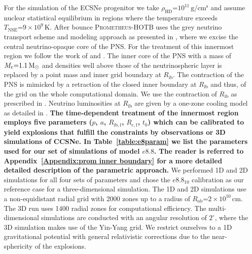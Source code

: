 \documentclass[fleqn,usenatbib]{mnras}
\newcommand{\solm}{\ensuremath{\rm{M_{\odot}}}\xspace}
\newcommand{\prom}{\textsc{Prometheus-HOTB}\xspace}
\begin{document}
For the simulation of the ECSNe progenitor we take $\rho_{\mathrm{HD}}\mathord{=}10^{11}\,\mathrm{g/cm^s}$ and assume nuclear statistical equilibrium in regions where the temperature exceeds $T_{\mathrm{NSE}}\mathord{=}9\times10^9\,\mathrm{K}$.
After bounce \prom uses the grey neutrino transport scheme and modeling approach as presented in \cite{Scheck2006}, where we excise the central neutrino-opaque core of the PNS. For the treatment of this innermost region we follow the work of \cite{Ugliano2012} and \cite{Sukhbold2016}. 
The inner core of the PNS with a mass of $M_{\mathrm{c}}\mathord{=}1.1\,\solm$ and densities well above those of the neutrinospheric layer is replaced by a point mass and inner grid boundary at $R_{\mathrm{ib}}$. The contraction of the PNS is mimicked by a retraction of the closed inner boundary at $R_{\mathrm{ib}}$ and thus, of the grid on the whole computational domain. We use the contraction of $R_{\mathrm{ib}}$ as prescribed in \cite{Ertl2016}.
Neutrino luminosities at $R_{\mathrm{ib}}$ are given by a one-zone cooling model as detailed in \cite{Ugliano2012}.
\textbf{The time-dependent treatment of the innermost region employs five parameters ($p$, $a$, $R_{\mathrm{ib,f}}$, $R_{\mathrm{c,f}}$, $t_{0}$) which can be calibrated to yield explosions that fulfill the constraints by observations or 3D simulations of CCSNe.
In Table~\ref{table:e8param} we list the parameters used for our set of simulations of model $e8.8$. The reader is referred to Appendix~\ref{Appendix:prom inner boundary} for a more detailed detailed description of the parametric approach.}
We performed 1D and 2D simulations for all four sets of parameters and chose the $e8.8_{10}$ calibration as our reference case for a three-dimensional simulation. The 1D and 2D simulations use a non-equidistant radial grid with 2000 zones up to a radius of $R_{\mathrm{ob}}\mathord{=}2\times 10^{10}\,\text{cm}$. 
The 3D run uses 1400 radial zones for computational efficiency. 
The multi-dimensional simulations are conducted with an angular resolution of $2^{\circ}$, where the 3D simulation makes use of the Yin-Yang grid.
We restrict ourselves to a 1D gravitational potential with general relativistic corrections due to the near-sphericity of the explosions.
\end{document}
